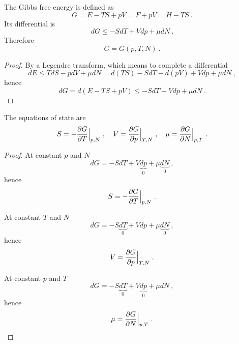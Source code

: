     The Gibbs free energy is defined as 
    \begin{equation*}
        G = E - TS + pV = F + pV = H - TS ~.
    \end{equation*}
    Its differential is 
    \begin{equation} \label{td:d:g}
        dG \leq - SdT + Vdp + \mu dN ~.
    \end{equation}
    Therefore
    \begin{equation*}
        G = G(p, T, N) ~.
    \end{equation*}
    \begin{proof}
        By a Legendre transform, which means to complete a differential
        \begin{equation*}
            dE \leq T dS - p dV + \mu dN = d(TS) - S dT - d(pV) + V dp + \mu dN ~,
        \end{equation*}
        hence 
        \begin{equation*}
            dG = d(E - TS + pV) \leq - S dT + Vdp + \mu dN ~.
        \end{equation*}
    \end{proof}

    The equations of state are
    \begin{equation}\label{td:es:g}
        S = - \frac{\partial G}{\partial T} \Big \vert_{p,N} ~, \quad V = \frac{\partial G}{\partial p} \Big \vert_{T,N} ~, \quad \mu = \frac{\partial G}{\partial N} \Big \vert_{p,T} ~. 
    \end{equation}
    \begin{proof}
        At constant $p$ and $N$
        \begin{equation*}
            dG = - S dT + V\underbrace{dp }_0 + \mu \underbrace{dN}_0  ~,
        \end{equation*}
        hence 
        \begin{equation*}
            S = - \frac{\partial G}{\partial T} \Big \vert_{p,N}  ~.
        \end{equation*}

        At constant $T$ and $N$
        \begin{equation*}
            dG = - S \underbrace{dT}_0  + Vdp + \mu \underbrace{dN}_0  ~,
        \end{equation*}
        hence 
        \begin{equation*}
            V = \frac{\partial G}{\partial p} \Big \vert_{T,N} ~.
        \end{equation*}

        At constant $p$ and $T$
        \begin{equation*}
            dG = - S \underbrace{dT}_0  + V\underbrace{dp}_0  + \mu dN ~,
        \end{equation*}
        hence 
        \begin{equation*}
            \mu = \frac{\partial G}{\partial N} \Big \vert_{p,T} ~.
        \end{equation*}
    \end{proof}

